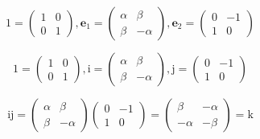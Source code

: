 \documentclass[
]{book}
\theoremstyle{definition}
\theoremstyle{definition}
\theoremstyle{definition}
\theoremstyle{definition}
\theoremstyle{remark}
\begin{document}
\[
1=\begin{pmatrix}1 & 0\\
0 & 1
\end{pmatrix},\boldsymbol{e}_{{\scriptscriptstyle 1}}=\begin{pmatrix}\alpha & \beta\\
\beta & -\alpha
\end{pmatrix},\boldsymbol{e}_{{\scriptscriptstyle 2}}=\begin{pmatrix}0 & -1\\
1 & 0
\end{pmatrix}
\]

\[
1=\begin{pmatrix}1 & 0\\
0 & 1
\end{pmatrix},\mathrm{i}=\begin{pmatrix}\alpha & \beta\\
\beta & -\alpha
\end{pmatrix},\mathrm{j}=\begin{pmatrix}0 & -1\\
1 & 0
\end{pmatrix}
\]

\[
\mathrm{i}\mathrm{j}=\begin{pmatrix}\alpha & \beta\\
\beta & -\alpha
\end{pmatrix}\begin{pmatrix}0 & -1\\
1 & 0
\end{pmatrix}=\begin{pmatrix}\beta & -\alpha\\
-\alpha & -\beta
\end{pmatrix}=\mathrm{k}
\]
\end{document}
